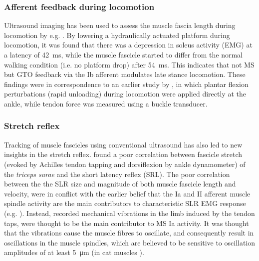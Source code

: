 \subsubsection{Afferent feedback during locomotion}
Ultrasound imaging has been used to assess the muscle fascia length during locomotion by e.g. \citet{klint_afferent_2009}. By lowering a hydraulically actuated platform during locomotion, it was found that there was a depression in soleus activity (EMG) at a latency of \SI{42}{\milli\second}, while the muscle fascicle started to differ from the normal walking condition (i.e. no platform drop) after \SI{54}{\milli\second}. This indicates that not MS but GTO feedback via the Ib afferent modulates late stance locomotion. These findings were in correspondence to an earlier study by \citet{grey_positive_2007}, in which plantar flexion perturbations (rapid unloading) during locomotion were applied directly at the ankle, while tendon force was measured using a buckle transducer. 


\subsubsection{Stretch reflex}
Tracking of muscle fascicles using conventional ultrasound has also led to new insights in the stretch reflex. \citet{cronin_triceps_2015} found a poor correlation between fascicle stretch (evoked by Achilles tendon tapping and dorsiflexion by ankle dynamometer) of the \textit{triceps surae} and the short latency reflex (SRL). The poor correlation between the the SLR size and magnitude of both muscle fascicle length and velocity, were in conflict with the earlier belief that the Ia and II afferent muscle spindle activity are the main contributors to characteristic SLR EMG response (e.g. \cite{schuurmans_monosynaptic_2009}). Instead, recorded mechanical vibrations in the limb induced by the tendon taps, were thought to be the main contributor to MS Ia activity. It was thought that the vibrations cause the muscle fibres to oscillate, and consequently result in oscillations in the muscle spindles, which are believed to be sensitive to oscillation amplitudes of at least \SI{5}{\micro\meter} (in cat muscles \cite{brown_relative_1967}). 


